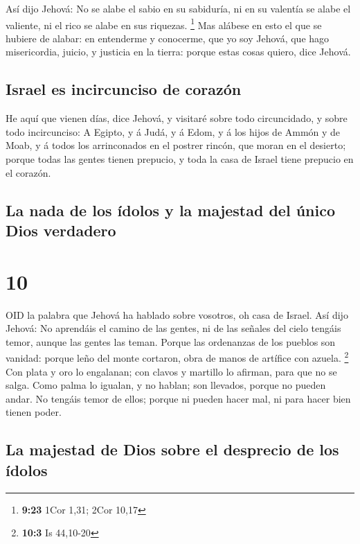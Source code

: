  Así dijo Jehová: No se alabe el sabio en su sabiduría, ni
en su valentía se alabe el valiente, ni el rico se alabe en sus
riquezas. \footnote{\textbf{9:23} 1Cor 1,31; 2Cor 10,17} 
Mas alábese en esto el que se hubiere de alabar: en entenderme y
conocerme, que yo soy Jehová, que hago misericordia, juicio, y justicia
en la tierra: porque estas cosas quiero, dice Jehová.

\hypertarget{israel-es-incircunciso-de-corazuxf3n}{%
\subsection{Israel es incircunciso de
corazón}\label{israel-es-incircunciso-de-corazuxf3n}}

 He aquí que vienen días, dice Jehová, y visitaré sobre
todo circuncidado, y sobre todo incircunciso:  A Egipto, y
á Judá, y á Edom, y á los hijos de Ammón y de Moab, y á todos los
arrinconados en el postrer rincón, que moran en el desierto; porque
todas las gentes tienen prepucio, y toda la casa de Israel tiene
prepucio en el corazón.

\hypertarget{la-nada-de-los-uxeddolos-y-la-majestad-del-uxfanico-dios-verdadero}{%
\subsection{La nada de los ídolos y la majestad del único Dios
verdadero}\label{la-nada-de-los-uxeddolos-y-la-majestad-del-uxfanico-dios-verdadero}}

\hypertarget{section-9}{%
\section{10}\label{section-9}}

 OID la palabra que Jehová ha hablado sobre vosotros, oh
casa de Israel.  Así dijo Jehová: No aprendáis el camino de
las gentes, ni de las señales del cielo tengáis temor, aunque las gentes
las teman.  Porque las ordenanzas de los pueblos son
vanidad: porque leño del monte cortaron, obra de manos de artífice con
azuela. \footnote{\textbf{10:3} Is 44,10-20}  Con plata y
oro lo engalanan; con clavos y martillo lo afirman, para que no se
salga.  Como palma lo igualan, y no hablan; son llevados,
porque no pueden andar. No tengáis temor de ellos; porque ni pueden
hacer mal, ni para hacer bien tienen poder.

\hypertarget{la-majestad-de-dios-sobre-el-desprecio-de-los-uxeddolos}{%
\subsection{La majestad de Dios sobre el desprecio de los
ídolos}\label{la-majestad-de-dios-sobre-el-desprecio-de-los-uxeddolos}}

